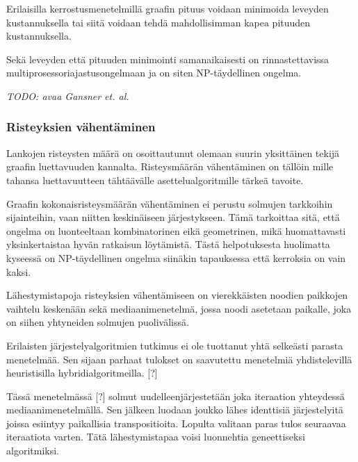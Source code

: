 \documentclass[finnish,12pt]{article}
\begin{document}
Erilaisilla kerrostusmenetelmillä graafin pituus voidaan minimoida leveyden kustannuksella tai siitä voidaan tehdä mahdollisimman kapea pituuden kustannuksella.

Sekä leveyden että pituuden minimointi samanaikaisesti on rinnastettavissa multiprosessoriajastusongelmaan ja on siten NP-täydellinen ongelma. \cite{RefWorks:39}

\emph{TODO: avaa Gansner et. al.}

		\subsubsection{Risteyksien vähentäminen}

Lankojen risteysten määrä on osoittautunut olemaan suurin yksittäinen tekijä graafin luettavuuden kannalta. \cite{RefWorks:47}
Risteysmäärän vähentäminen on tällöin mille tahansa luettavuutteen tähtäävälle asettelualgoritmille tärkeä tavoite.

Graafin kokonaisristeysmäärän vähentäminen ei perustu solmujen tarkkoihin sijainteihin, vaan niitten keskinäiseen järjestykseen. Tämä tarkoittaa sitä, että ongelma on luonteeltaan kombinatorinen eikä geometrinen, mikä huomattavasti yksinkertaistaa hyvän ratkaisun löytämistä.
Tästä helpotuksesta huolimatta kyseessä on NP-täydellinen ongelma siinäkin tapauksessa että kerroksia on vain kaksi. \cite{RefWorks:40}

Lähestymistapoja risteyksien vähentämiseen on vierekkäisten noodien paikkojen
vaihtelu keskenään sekä mediaanimenetelmä, jossa noodi asetetaan paikalle, joka
on siihen yhtyneiden solmujen puolivälissä.


Erilaisten järjestelyalgoritmien tutkimus ei ole tuottanut yhtä selkeästi parasta menetelmää.
Sen sijaan parhaat tulokset on saavutettu menetelmiä yhdistelevillä heuristisilla hybridialgoritmeilla. [?]

Tässä menetelmässä [?] solmut uudelleenjärjestetään joka iteraation yhteydessä mediaanimenetelmällä.
Sen jälkeen luodaan joukko lähes identtisiä järjestelyitä joissa esiintyy paikallisia transpositioita.
Lopulta valitaan paras tulos seuraavaa iteraatiota varten.
Tätä lähestymistapaa voisi luonnehtia geneettiseksi algoritmiksi.

\end{document}
